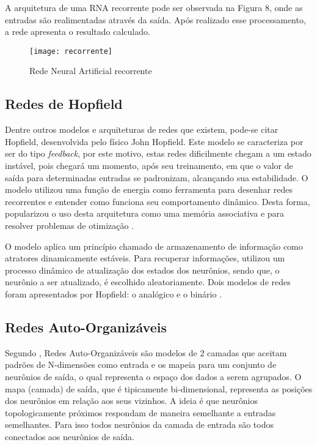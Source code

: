 A arquitetura de uma RNA recorrente pode ser observada na Figura 8, onde as entradas são realimentadas através da saída. Após realizado esse processamento, a rede apresenta o resultado calculado.

\begin{figure}[h]
	\centering
	\texttt{[image: recorrente]}
	\caption{Rede Neural Artificial recorrente}
	\label{fig-recorrente}
\end{figure}

\subsection{Redes de Hopfield}
Dentre outros modelos e arquiteturas de redes que existem, pode-se citar Hopfield, desenvolvida pelo físico John Hopfield. Este modelo se caracteriza por ser do tipo \textit{feedback}, por este motivo, estas redes dificilmente chegam a um estado instável, pois chegará um momento, após seu treinamento, em que o valor de saída para determinadas entradas se padronizam, alcançando sua estabilidade. O modelo utilizou uma função de energia como ferramenta para desenhar redes recorrentes e entender como funciona seu comportamento dinâmico. Desta forma, popularizou o uso desta arquitetura como uma memória associativa e para resolver problemas de otimização \cite{cardon}.

O modelo aplica um princípio chamado de armazenamento de informação como atratores dinamicamente estáveis. Para recuperar informações, utilizou um processo dinâmico de atualização dos estados dos neurônios, sendo que, o neurônio a ser atualizado, é escolhido aleatoriamente. Dois modelos de redes foram apresentados por Hopfield: o analógico e o binário \cite{silva}.

\subsection{Redes Auto-Organizáveis}
Segundo , Redes Auto-Organizáveis são modelos de 2 camadas que aceitam padrões de N-dimensões como entrada e os mapeia para um conjunto de neurônios de saída, o qual representa o espaço dos dados a serem agrupados. O mapa (camada) de saída, que é tipicamente bi-dimensional, representa as posições dos neurônios em relação aos seus vizinhos. A ideia é que neurônios topologicamente próximos respondam de maneira semelhante a entradas semelhantes. Para isso todos neurônios da camada de entrada são todos conectados aos neurônios de saída.

